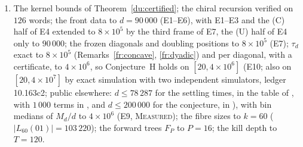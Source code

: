 \documentclass[11pt]{article}
\theoremstyle{definition}
\theoremstyle{remark}
\newcommand{\EXACT}{\textsc{Exact}}
\newcommand{\MEASURED}{\textsc{Measured}}
\begin{document}
\begin{enumerate}[nosep]
\item[\EXACT] The kernel bounds of Theorem~\ref{du:certified}; the chiral recursion verified on $126$ words; the front data to $d=90\,000$ (E1--E6), with E1--E3 and the (C) half of E4 extended to $8\times10^{5}$ by the third frame of E7, the (U) half of E4 only to $90\,000$; the frozen diagonals and doubling positions to $8\times10^{5}$ (E7); $\tau_d$ exact to $8\times10^{5}$ (Remarks~\ref{fr:concave}, \ref{fr:dyadic}) and per diagonal, with a certificate, to $4\times10^{6}$, so Conjecture~H holds on $[20,4\times10^{6}]$ (E10; also on $[20,4\times10^{7}]$ by exact simulation with two independent simulators, ledger 10.163c2; public elsewhere: $d\le78\,287$ for the settling times, in the table of \cite{Wolfram19}, with $1\,000$ terms in \cite{A363346}, and $d\le200\,000$ for the conjecture, in \cite{Dib}), with bin medians of $M_d/d$ to $4\times10^{6}$ (E9, \MEASURED); the fibre sizes to $k=60$ ($|L_{60}(01)|=103\,220$); the forward trees $F_P$ to $P=16$; the kill depth to $T=120$.

\end{enumerate}
\end{document}
